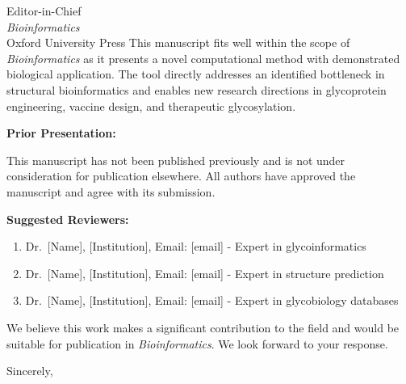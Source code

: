 \documentclass[11pt]{letter}
\begin{document}
\begin{letter}{Editor-in-Chief\\
\textit{Bioinformatics}\\
Oxford University Press}
This manuscript fits well within the scope of \textit{Bioinformatics} as it presents a novel computational method with demonstrated biological application. The tool directly addresses an identified bottleneck in structural bioinformatics and enables new research directions in glycoprotein engineering, vaccine design, and therapeutic glycosylation.

\textbf{Prior Presentation:}

This manuscript has not been published previously and is not under consideration for publication elsewhere. All authors have approved the manuscript and agree with its submission.

\textbf{Suggested Reviewers:}

\begin{enumerate}
\item Dr.\ [Name], [Institution], Email: [email] - Expert in glycoinformatics
\item Dr.\ [Name], [Institution], Email: [email] - Expert in structure prediction
\item Dr.\ [Name], [Institution], Email: [email] - Expert in glycobiology databases
\end{enumerate}

We believe this work makes a significant contribution to the field and would be suitable for publication in \textit{Bioinformatics}. We look forward to your response.

\closing{Sincerely,}

\end{letter}
\end{document}
